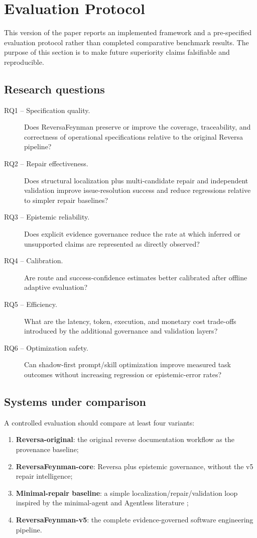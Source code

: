 \section{Evaluation Protocol}

This version of the paper reports an implemented framework and a pre-specified evaluation protocol rather than completed comparative benchmark results. The purpose of this section is to make future superiority claims falsifiable and reproducible.

\subsection{Research questions}

\begin{description}
  \item[RQ1 -- Specification quality.] Does ReversaFeynman preserve or improve the coverage, traceability, and correctness of operational specifications relative to the original Reversa pipeline?
  \item[RQ2 -- Repair effectiveness.] Does structural localization plus multi-candidate repair and independent validation improve issue-resolution success and reduce regressions relative to simpler repair baselines?
  \item[RQ3 -- Epistemic reliability.] Does explicit evidence governance reduce the rate at which inferred or unsupported claims are represented as directly observed?
  \item[RQ4 -- Calibration.] Are route and success-confidence estimates better calibrated after offline adaptive evaluation?
  \item[RQ5 -- Efficiency.] What are the latency, token, execution, and monetary cost trade-offs introduced by the additional governance and validation layers?
  \item[RQ6 -- Optimization safety.] Can shadow-first prompt/skill optimization improve measured task outcomes without increasing regression or epistemic-error rates?
\end{description}

\subsection{Systems under comparison}

A controlled evaluation should compare at least four variants:

\begin{enumerate}
  \item \textbf{Reversa-original}: the original reverse documentation workflow as the provenance baseline;
  \item \textbf{ReversaFeynman-core}: Reversa plus epistemic governance, without the v5 repair intelligence;
  \item \textbf{Minimal-repair baseline}: a simple localization/repair/validation loop inspired by the minimal-agent and Agentless literature \cite{xia2024agentless};
  \item \textbf{ReversaFeynman-v5}: the complete evidence-governed software engineering pipeline.
\end{enumerate}

